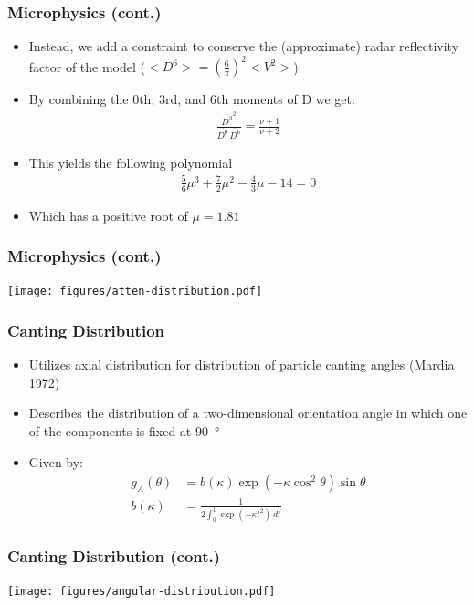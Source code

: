 \documentclass[red]{beamer}
\begin{document}
\begin{frame}[<+->]
	\frametitle{Microphysics (cont.)}
	\begin{itemize}
		\item Instead, we add a constraint to conserve the (approximate) radar reflectivity factor of the model ($<D^6> = \left(\frac{6}{\pi}\right)^2<V^2>$)
		\item By combining the 0th, 3rd, and 6th moments of D we get:
		\begin{align}
			\frac{\overline{D^3}^2}{\overline{D^0}\,\overline{D^6}} =  \frac{\nu + 1}{\nu + 2}
		\end{align}
		\item This yields the following polynomial
		\begin{align}
			\frac{\num{5}}{\num{6}} \mu^3 + \frac{\num{7}}{\num{2}} \mu^2 - \frac{\num{4}}{\num{3}} \mu - \num{14} = 0
		\end{align}
		\item Which has a positive root of $\mu=\num{1.81}$
	\end{itemize}
\end{frame}

\begin{frame}
	\frametitle{Microphysics (cont.)}
	\begin{center}
		\texttt{[image: figures/atten-distribution.pdf]}
	\end{center}
\end{frame}

\begin{frame}
	\frametitle{Canting Distribution}
	\begin{itemize}
		\item Utilizes axial distribution for distribution of particle canting angles (Mardia 1972)
		\item Describes the distribution of a two-dimensional orientation angle in which one of the components is fixed at \SI{90}{\degree}
		\item Given by:
		\begin{align*}
			g_A(\theta) &= b(\kappa) \exp(-\kappa \cos^2{\theta}) \sin{\theta} \\
			b(\kappa) &= \frac{1}{2 \int_0^1 \exp(-\kappa t^2)\,dt}
		\end{align*}
	\end{itemize}
\end{frame}

\begin{frame}
	\frametitle{Canting Distribution (cont.)}
	\begin{center}
		\texttt{[image: figures/angular-distribution.pdf]}
	\end{center}	
\end{frame}
\end{document}
